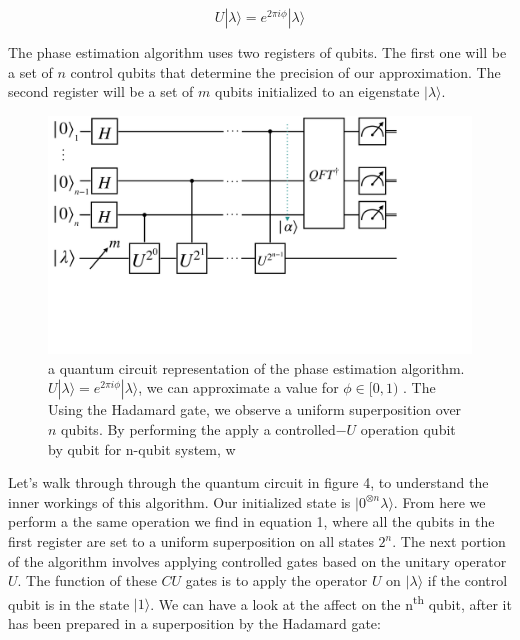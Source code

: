 \documentclass[twocolumn,showpacs,preprintnumbers,amsmath,amssymb]{revtex4}
\begin{document}
		\begin{equation}
		 U |\lambda \rangle = e^{2\pi i \phi} |\lambda \rangle
	    \end{equation}
	    
	    The phase estimation algorithm uses two registers of qubits. The first one will be a set of $n$ control qubits that determine the precision of our approximation. The second register will be a set of $m$ qubits initialized to an eigenstate $|\lambda\rangle$.
	    
	    
		\begin{figure}[!h]
			\centering
			\includegraphics[trim={1cm 12cm 11cm 0},clip, width=0.99 \linewidth]{"graphics/phase_circ"}
			\caption{a quantum circuit representation of the phase estimation algorithm. $ U |\lambda \rangle = e^{2\pi i \phi} |\lambda \rangle $, we can  approximate a value for $\phi \in [0,1)$ . The  Using the Hadamard gate, we observe a uniform superposition over $n$ qubits. By performing the apply a controlled$-U$ operation qubit by qubit for n-qubit system, w}
			\label{fig:phasrcircuit}
		\end{figure}
		
		
		Let's walk through through the quantum circuit in figure 4, to understand the inner workings of this algorithm.	 Our initialized state is $|0^{\otimes n} \lambda\rangle$. From here we perform a the same operation we find in equation 1, where all the qubits in the first register are set to a uniform superposition on all states $2^n$. The next portion of the algorithm involves applying controlled gates based on the unitary operator $U$. The function of these $CU$ gates is to apply the operator $U$ on $|\lambda\rangle$ if the control qubit is in the state $|1\rangle$. We can have a look at the affect on the n\textsuperscript{th} qubit, after it has been prepared in a superposition by the Hadamard gate:
		
\end{document}
